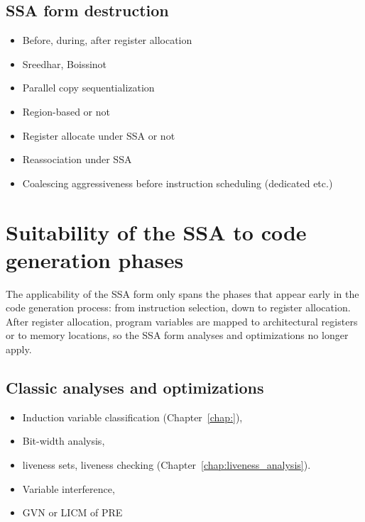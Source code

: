 \subsection{SSA form destruction}

\begin{itemize}

\item Before, during, after register allocation

\item Sreedhar, Boissinot

\item Parallel copy sequentialization

\end{itemize}

\begin{itemize}

\item Region-based or not

\item Register allocate under SSA or not

\item Reassociation under SSA

\item Coalescing aggressiveness before instruction scheduling (dedicated etc.)

\end{itemize}


\section{Suitability of the SSA to code generation phases}
\label{sec:ssa-codegen-suitability}

The applicability of the SSA form only spans the phases that appear
early in the code generation process: from instruction selection, down to
register allocation. After register allocation, program variables are mapped to
architectural registers or to memory locations, so the SSA form analyses and
optimizations no longer apply.

\subsection{Classic analyses and optimizations}

\begin{itemize}

\item Induction variable classification (Chapter~\ref{chap:}),

\item Bit-width analysis,

\item liveness sets, liveness checking
(Chapter~\ref{chap:liveness_analysis}).

\item Variable interference,

\item GVN or LICM of PRE

\end{itemize}

